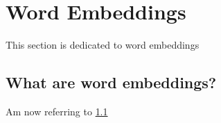 \chapter{Word Embeddings}
\label{chap:word_embeddings}

This section is dedicated to word embeddings

\section{What are word embeddings?}
\label{sec:word_embeddings_question}

Am now referring to \ref{sec:word_embeddings_question}

